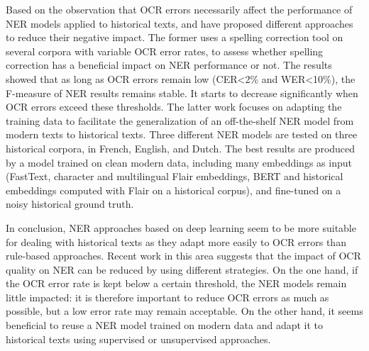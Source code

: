 Based on the observation that OCR errors necessarily affect the performance of NER models applied to historical texts, \cite{huynh2020use} and \cite{marz2021data} have proposed different approaches to reduce their negative impact.
The former uses a spelling correction tool on several corpora with variable OCR error rates, to assess whether spelling correction has a beneficial impact on NER performance or not.
The results showed that as long as OCR errors remain low (CER<2\% and WER<10\%), the F-measure of NER results remains stable.
It starts to decrease significantly when OCR errors exceed these thresholds.
The latter work focuses on adapting the training data to facilitate the generalization of an off-the-shelf NER model from modern texts to historical texts.
Three different NER models are tested on three historical corpora, in French, English, and Dutch. The best results are produced by a model trained on clean modern data, including many  embeddings as input (FastText, character and multilingual Flair embeddings, BERT and historical embeddings computed with Flair on a historical corpus), and fine-tuned on a noisy historical ground truth.

In conclusion, NER approaches based on deep learning seem to be more suitable for dealing with historical texts as they adapt more easily to OCR errors than rule-based approaches.
Recent work in this area suggests that the impact of OCR quality on NER can be reduced by using different strategies.
On the one hand, if the OCR error rate is kept below a certain threshold, the NER models remain little impacted: it is therefore important to reduce OCR errors as much as possible, but a low error rate may remain acceptable.
On the other hand, it seems beneficial to reuse a NER model trained on modern data and adapt it to historical texts using supervised or unsupervised approaches. 





